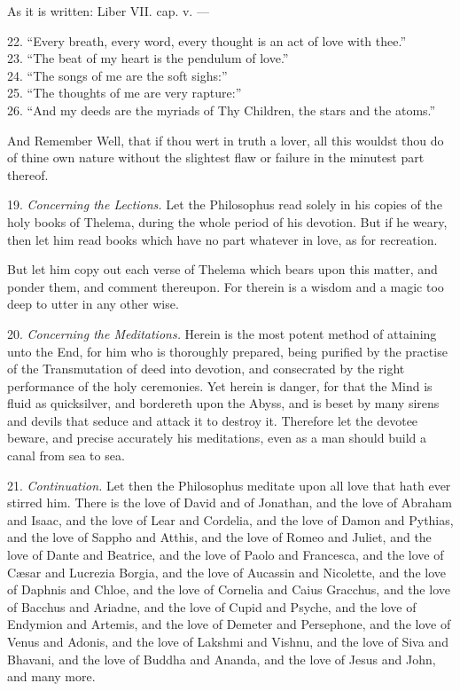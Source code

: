As it is written: Liber VII. cap. v. ---
\begin{quoting}[indentfirst=false]
22. \enquote{Every breath, every word, every thought is an act of love with thee.} \\
23. \enquote{The beat of my heart is the pendulum of love.} \\
24. \enquote{The songs of me are the soft sighs:} \\
25. \enquote{The thoughts of me are very rapture:} \\
26. \enquote{And my deeds are the myriads of Thy Children, the stars and the atoms.}
\end{quoting}

And Remember Well, that if thou wert in truth a lover, all this wouldst thou do of thine own nature without the slightest flaw or failure in the minutest part thereof.

19. \textit{Concerning the Lections.} Let the Philosophus read solely in his copies of the holy books of Thelema, during the whole period of his devotion. But if he weary, then let him read books which have no part whatever in love, as for recreation.

But let him copy out each verse of Thelema which bears upon this matter, and ponder them, and comment thereupon. For therein is a wisdom and a magic too deep to utter in any other wise.

20. \textit{Concerning the Meditations.} Herein is the most potent method of attaining unto the End, for him who is thoroughly prepared, being purified by the practise of the Transmutation of deed into devotion, and consecrated by the right performance of the holy ceremonies. Yet herein is danger, for that the Mind is fluid as quicksilver, and bordereth upon the Abyss, and is beset by many sirens and devils that seduce and attack it to destroy it. Therefore let the devotee beware, and precise accurately his meditations, even as a man should build a canal from sea to sea.

21. \textit{Continuation.} Let then the Philosophus meditate upon all love that hath ever stirred him. There is the love of David and of Jonathan, and the love of Abraham and Isaac, and the love of Lear and Cordelia, and the love of Damon and Pythias, and the love of Sappho and Atthis, and the love of Romeo and Juliet, and the love of Dante and Beatrice, and the love of Paolo and Francesca, and the love of C\ae{}sar and Lucrezia Borgia, and the love of Aucassin and Nicolette, and the love of Daphnis and Chloe, and the love of Cornelia and Caius Gracchus, and the love of Bacchus and Ariadne, and the love of Cupid and Psyche, and the love of Endymion and Artemis, and the love of Demeter and Persephone, and the love of Venus and Adonis, and the love of Lakshmi and Vishnu, and the love of Siva and Bhavani, and the love of Buddha and Ananda, and the love of Jesus and John, and many more.

